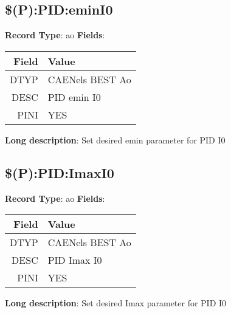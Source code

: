 \subsection{\$(P):PID:eminI0}
\textbf{Record Type}: ao \newline \newline 
\textbf{Fields}: \newline 
\begin{tabularx}{0.7\linewidth}{|r|X|}
\hline Field & Value \\
\hline
\hline
DTYP & CAENels BEST Ao\\
\hline
DESC & PID emin I0\\
\hline
PINI & YES\\
\hline
\end{tabularx}
\newline \newline \newline
\textbf{Long description}: \newline 
 Set desired emin parameter for PID I0
\newline \newline

\subsection{\$(P):PID:ImaxI0}
\textbf{Record Type}: ao \newline \newline 
\textbf{Fields}: \newline 
\begin{tabularx}{0.7\linewidth}{|r|X|}
\hline Field & Value \\
\hline
\hline
DTYP & CAENels BEST Ao\\
\hline
DESC & PID Imax I0\\
\hline
PINI & YES\\
\hline
\end{tabularx}
\newline \newline \newline
\textbf{Long description}: \newline 
 Set desired Imax parameter for PID I0
\newline \newline

